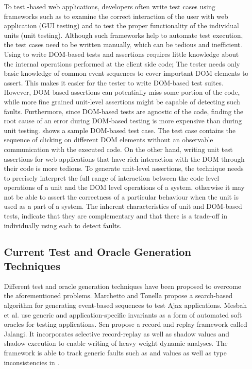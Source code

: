 To test \javascript-based web applications, developers
often write test cases using frameworks such as \selenium \cite{selenium} to examine the correct interaction of the user with web application (GUI testing) and \qunit \cite{quint} to test the proper functionality of the individual units (unit testing).
Although such frameworks help to automate test execution, the
test cases need to be written manually, which can be tedious
and inefficient. 
Using \selenium to write DOM-based tests and assertions
requires little knowledge about the internal operations performed at the client side code; The tester needs only basic knowledge of common event sequences to cover important DOM elements to assert. 
This makes it easier for the tester to write DOM-based test suites. However, DOM-based assertions can potentially miss some portion of the
code, while more fine grained unit-level assertions might be capable of detecting such faults. Furthermore, since DOM-based tests are agnostic of the \javascript code, finding the root cause of an error during DOM-based testing is more expensive than during unit testing. 
 shows a sample DOM-based test case. The test case contains the sequence of clicking on different DOM elements without an observable communication with the executed \javascript code.  
On the other hand,
writing unit test assertions for web applications that have rich interaction with the DOM through their \javascript code is more tedious. 
To generate unit-level assertions, the technique needs to precisely interpret the full range of interaction between the code level operations of a unit and the DOM level operations of a system, otherwise it may not be able to assert the correctness of a particular behaviour when the unit is used as a part of a system. The inherent characteristics of unit and DOM-based tests, indicate that they are complementary and that there is a trade-off in individually using each to detect faults. 

\subsection{Current Test and Oracle Generation Techniques} 
Different test and oracle generation techniques have been proposed to overcome the aforementioned problems.
 Marchetto and Tonella \cite{marchetto:search} propose a search-based algorithm for generating event-based sequences to test Ajax applications. 
Mesbah et al. \cite{mesbah:tse12} use generic and application-specific invariants as a form of automated soft oracles for testing \ajax applications.
Sen \etal \cite{sen:fse13} propose a record and replay framework called Jalangi. It incorporates selective record-replay as well as shadow values and shadow execution to enable writing of heavy-weight dynamic analyses.
The framework is able to track generic faults such as  and  values as well as type inconsistencies in \javascript. 


